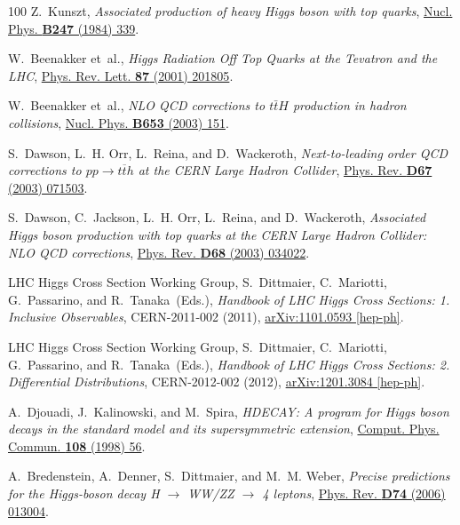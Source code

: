 \documentclass[final,3p,times,twocolumn]{elsarticle}
\begin{document}
\begin{thebibliography}{100}
Z.~Kunszt, {\em {Associated production of heavy Higgs boson with top quarks}},
  \href{http://dx.doi.org/10.1016/0550-3213(84)90553-4}{Nucl. Phys. {\bfseries
  B247} (1984) 339}.

W.~Beenakker {et~al.}, {\em {Higgs Radiation Off Top Quarks at the Tevatron and
  the LHC}}, \href{http://dx.doi.org/10.1103/PhysRevLett.87.201805}{Phys. Rev.
  Lett. {\bfseries 87} (2001) 201805}.

W.~Beenakker {et~al.}, {\em {NLO QCD corrections to $t\bar{t}H$ production in
  hadron collisions}},
  \href{http://dx.doi.org/10.1016/S0550-3213(03)00044-0}{Nucl. Phys. {\bfseries
  B653} (2003) 151}.

S.~Dawson, L.~H. Orr, L.~Reina, and D.~Wackeroth, {\em {Next-to-leading order
  QCD corrections to $pp\rightarrow t\overline{t}h$ at the CERN Large Hadron
  Collider}}, \href{http://dx.doi.org/10.1103/PhysRevD.67.071503}{Phys. Rev.
  {\bfseries D67} (2003) 071503}.

S.~Dawson, C.~Jackson, L.~H. Orr, L.~Reina, and D.~Wackeroth, {\em {Associated
  Higgs boson production with top quarks at the CERN Large Hadron Collider: NLO QCD
  corrections}}, \href{http://dx.doi.org/10.1103/PhysRevD.68.034022}{Phys. Rev.
  {\bfseries D68} (2003) 034022}.

{LHC Higgs Cross Section Working Group}, S.~Dittmaier, C.~Mariotti,
  G.~Passarino, and R.~Tanaka~(Eds.), {\em {Handbook of LHC Higgs Cross
  Sections: 1. Inclusive Observables}}, {CERN-2011-002} (2011),
  \href{http://arxiv.org/abs/1101.0593}{{\ttfamily arXiv:1101.0593 [hep-ph]}}.

{LHC Higgs Cross Section Working Group}, S.~Dittmaier, C.~Mariotti,
  G.~Passarino, and R.~Tanaka~(Eds.), {\em {Handbook of LHC Higgs Cross
  Sections: 2. Differential Distributions}}, {CERN-2012-002} (2012),
  \href{http://arxiv.org/abs/1201.3084}{{\ttfamily arXiv:1201.3084 [hep-ph]}}.

A.~Djouadi, J.~Kalinowski, and M.~Spira, {\em {HDECAY: A program for Higgs
  boson decays in the standard model and its supersymmetric extension}},
  \href{http://dx.doi.org/10.1016/S0010-4655(97)00123-9}{Comput. Phys. Commun.
  {\bfseries 108} (1998) 56}.

A.~Bredenstein, A.~Denner, S.~Dittmaier, and M.~M. Weber, {\em {Precise
  predictions for the Higgs-boson decay H $\rightarrow$ WW/ZZ $\rightarrow$ 4
  leptons}}, \href{http://dx.doi.org/10.1103/PhysRevD.74.013004}{Phys. Rev.
  {\bfseries D74} (2006) 013004}.


\end{thebibliography}
\end{document}
